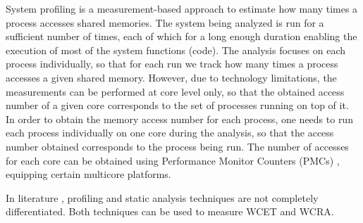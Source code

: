 System profiling \cite{Yun2012,Kim14} is a measurement-based approach to estimate how many times a process accesses  shared memories. The system being analyzed is run for a sufficient number of times, each of which for a long enough duration enabling the execution of most of the system functions (code). The analysis focuses on each process individually, so that for each run we track how many times a process accesses a given shared memory. However, due to technology limitations, the measurements can be performed at core level only, so that the obtained access number of a given core corresponds to the set of processes running on top of it. In order to obtain the memory access number for each process, one needs to run each process individually on one core during the analysis, so that the access number obtained corresponds to the process being run. The number of accesses for each core can be obtained using Performance Monitor Counters (PMCs) \cite{Yun2012}, equipping certain multicore platforms. %

In literature \cite{Kim14,Yun2012}, profiling and static analysis techniques are not completely differentiated. Both techniques can be used to measure WCET and WCRA.
  

